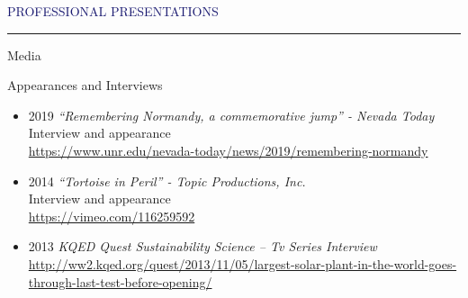 \documentclass{resume} %
\renewenvironment{rSection}[1]{
\sectionskip
\textcolor{MidnightBlue}{\MakeUppercase{#1}}
\sectionlineskip
\hrule
\begin{list}{}{
\setlength{\leftmargin}{1.5em}
}
\item[]
}{
\end{list}
}
\begin{document}
\begin{rSection}{Professional Presentations}
\begin{refsection}[bibdb]

\nocite{*}
%
\printbibliography[heading={subbibliography},title={Presentations},type=inproceedings, prenote=prnote, keyword={presentation}]
\end{refsection}
\begin{refsection}[bibdb]
\nocite{*}
%
\printbibliography[heading={subbibliography},title={Invited Presentations},type=inproceedings, prenote=prnote, keyword={invited}]
\end{refsection}
\begin{rSubsection}{Media}{}{}{}
\item Appearances and Interviews
\begin{itemize}
\item 2019 \textit{“Remembering Normandy, a commemorative jump” - Nevada Today}\\
Interview and appearance \\ 
\url{https://www.unr.edu/nevada-today/news/2019/remembering-normandy}
\item 2014 \textit{“Tortoise in Peril” - Topic Productions, Inc.}\\
Interview and appearance \\ 
\url{https://vimeo.com/116259592}
\item 2013 \textit{KQED Quest Sustainability Science – Tv Series Interview} \\ \url{http://ww2.kqed.org/quest/2013/11/05/largest-solar-plant-in-the-world-goes-through-last-test-before-opening/}


\end{itemize}
\end{rSubsection}
\end{rSection}
\end{document}
